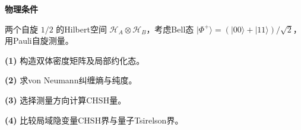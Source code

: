 \textbf{物理条件}\par 两个自旋 \(1/2\) 的Hilbert空间 \(\mathcal H_A\otimes\mathcal H_B\)，考虑Bell态 \(|\Phi^+\rangle=(|00\rangle+|11\rangle)/\sqrt2\)，用Pauli自旋测量。
\par\noindent\textbf{(1)} 构造双体密度矩阵及局部约化态。
\par\noindent\textbf{(2)} 求von Neumann纠缠熵与纯度。
\par\noindent\textbf{(3)} 选择测量方向计算CHSH量。
\par\noindent\textbf{(4)} 比较局域隐变量CHSH界与量子Tsirelson界。
